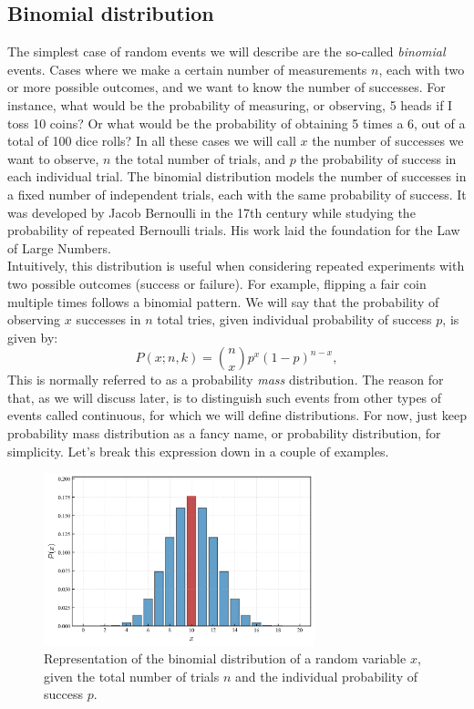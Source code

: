 \documentclass{book}
\begin{document}
\subsection{Binomial distribution}

The simplest case of random events we will describe are the so-called \textit{binomial} events. Cases where we make a certain number of measurements $n$, each with two or more possible outcomes, and we want to know the number of successes. For instance, what would be the probability of measuring, or observing, 5 heads if I toss 10 coins? Or what would be the probability of obtaining 5 times a 6, out of a total of 100 dice rolls? In all these cases we will call $x$ the number of successes we want to observe, $n$ the total number of trials, and $p$ the probability of success in each individual trial. The binomial distribution models the number of successes in a fixed number of independent trials, each with the same probability of success. It was developed by Jacob Bernoulli in the 17th century while studying the probability of repeated Bernoulli trials. His work laid the foundation for the Law of Large Numbers.\\

Intuitively, this distribution is useful when considering repeated experiments with two possible outcomes (success or failure). For example, flipping a fair coin multiple times follows a binomial pattern. We will say that the probability of observing $x$ successes in $n$ total tries, given individual probability of success $p$, is given by:
\begin{equation}
    P(x; n, k) = \binom{n}{x} p^x (1-p)^{n-x},
\end{equation}
This is normally referred to as a probability \textit{mass} distribution. The reason for that, as we will discuss later, is to distinguish such events from other types of events called continuous, for which we will define  distributions. For now, just keep probability mass distribution as a fancy name, or probability distribution, for simplicity. Let's break this expression down in a couple of examples.

\begin{figure}[ht]
    \centering
    \includegraphics[width=0.7\textwidth]{figures/chapter2/binomial_1.png}
    \caption{Representation of the binomial distribution of a random variable $x$, given the total number of trials $n$ and the individual probability of success $p$.}
    \label{fig:binomial1}
\end{figure}
\end{document}
